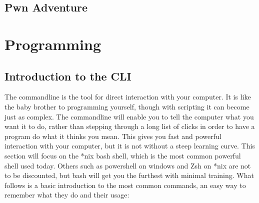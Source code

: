 \documentclass[a4paper,11pt]{report}
\begin{document}
	\section{Pwn Adventure}
\chapter{Programming}
	\label{ch:Programming}
	\section{Introduction to the CLI}
		The commandline is the tool for direct interaction with your computer. 
		It is like the baby brother to programming yourself, though with scripting it can become just as complex. 
		The commandline will enable you to tell the computer what you want it to do, rather than stepping through a long list of clicks in order to have a program do what it thinks you mean. 
		This gives you fast and powerful interaction with your computer, but it is not without a steep learning curve. 
		This section will focus on the \**nix bash shell, which is the most common powerful shell used today. 
		Others such as powershell on windows and Zsh on \**nix are not to be discounted, but bash will get you the furthest with minimal training.\cite{CLICrashCourse}
		What follows is a basic introduction to the most common commands, an easy way to remember what they do and their usage:
\end{document}
